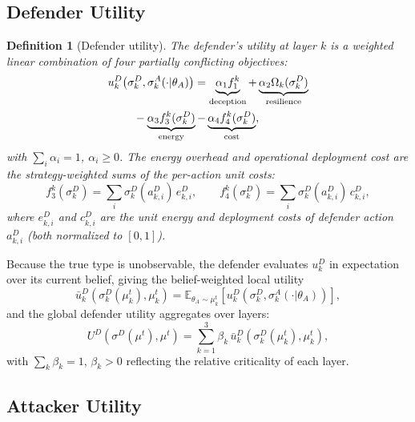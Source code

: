 \documentclass[conference]{IEEEtran}
\newtheorem{definition}{Definition}
\newcommand{\E}{\mathbb{E}}
\begin{document}
\subsection{Defender Utility}

\begin{definition}[Defender utility]\label{def:util_D}
The defender's utility at layer $k$ is a weighted linear combination of four
partially conflicting objectives:
\begin{align}
u_k^D&\!\left(\sigma_k^D,\sigma_k^A(\cdot|\theta_A)\right) =
\underbrace{\alpha_1 f_1^k}_{\text{deception}}
+ \underbrace{\alpha_2 \Omega_k(\sigma_k^D)}_{\text{resilience}} \notag\\
&\quad - \underbrace{\alpha_3 f_3^k(\sigma_k^D)}_{\text{energy}}
- \underbrace{\alpha_4 f_4^k(\sigma_k^D)}_{\text{cost}},
\label{eq:util_D_k}
\end{align}
with $\sum_i\alpha_i=1$, $\alpha_i\geq 0$. The energy overhead and operational
deployment cost are the strategy-weighted sums of the per-action unit costs:
\begin{equation}
f_3^k(\sigma_k^D) = \sum_i \sigma_k^D(a_{k,i}^D)\,e_{k,i}^D,
\qquad
f_4^k(\sigma_k^D) = \sum_i \sigma_k^D(a_{k,i}^D)\,c_{k,i}^D,
\label{eq:costs}
\end{equation}
where $e_{k,i}^D$ and $c_{k,i}^D$ are the unit energy and deployment costs of
defender action $a_{k,i}^D$ (both normalized to $[0,1]$).
\end{definition}

Because the true type is unobservable, the defender evaluates $u_k^D$ in
expectation over its current belief, giving the belief-weighted local utility
\begin{equation}
\bar{u}_k^D\!\left(\sigma_k^D(\mu_k^t),\mu_k^t\right) =
\E_{\theta_A\sim\mu_k^t}\!\left[u_k^D\!\left(\sigma_k^D,
\sigma_k^A(\cdot|\theta_A)\right)\right],
\end{equation}
and the global defender utility aggregates over layers:
\begin{equation}
U^D(\sigma^D(\mu^t),\mu^t) = \sum_{k=1}^3 \beta_k\,
\bar{u}_k^D\!\left(\sigma_k^D(\mu_k^t),\mu_k^t\right),
\label{eq:util_D_global}
\end{equation}
with $\sum_k\beta_k=1$, $\beta_k>0$ reflecting the relative criticality of each
layer.

\subsection{Attacker Utility}
\end{document}

